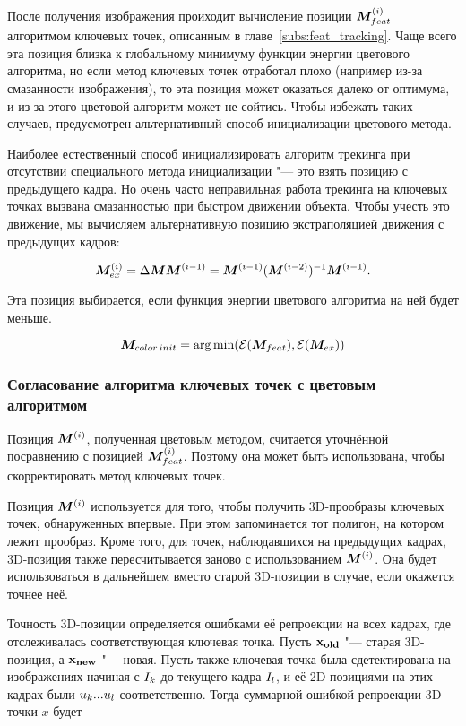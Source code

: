 После получения изображения проиходит вычисление позиции $\bm{M}^{\left( i \right)}_{feat}$
алгоритмом
ключевых точек, описанным в главе~\ref{subs:feat_tracking}.
Чаще всего эта позиция близка к глобальному минимуму функции энергии цветового
алгоритма, но если метод ключевых точек отработал плохо (например из-за
смазанности изображения), то эта позиция может оказаться далеко от оптимума, и
из-за этого цветовой алгоритм может не сойтись.
Чтобы избежать таких случаев, предусмотрен альтернативный способ инициализации
цветового метода.

Наиболее естественный способ инициализировать алгоритм трекинга при отсутствии
специального метода инициализации "--- это взять позицию с предыдущего кадра.
Но очень часто неправильная работа трекинга на ключевых точках вызвана
смазанностью при быстром движении объекта.
Чтобы учесть это движение, мы вычисляем альтернативную позицию экстраполяцией
движения с предыдущих кадров:

\begin{equation}
\label{eqn:extrapolation}
\bm{M}^{\left( i \right)}_{ex} = \Delta \bm{M} \bm{M}^{\left( i - 1 \right)} = \bm{M}^{\left( i -
1 \right)}(\bm{M}^{\left( i - 2 \right)})^{-1} \bm{M}^{\left( i - 1 \right)}
\text{.}
\end{equation}

Эта позиция выбирается, если функция энергии цветового алгоритма на ней будет
меньше.

\begin{equation}
\label{eqn:init_selection}
    \bm{M}_{color \, init} = \operatorname*{arg\,min}(\mathcal{E}(\bm{M}_{feat}), \mathcal{E}(\bm{M}_{ex}))
\end{equation}

\subsubsection*{Согласование алгоритма ключевых точек с цветовым алгоритмом}
Позиция $\bm{M}^{\left( i \right)}$, полученная цветовым методом, считается уточнённой
посравнению с позицией $\bm{M}^{\left( i \right)}_{feat}$.
Поэтому она может быть использована, чтобы скорректировать метод ключевых
точек.

Позиция $\bm{M}^{\left( i \right)}$ используется для того, чтобы получить 3D-прообразы
ключевых точек, обнаруженных впервые.
При этом запоминается тот полигон, на котором лежит прообраз.
Кроме того, для точек, наблюдавшихся на предыдущих кадрах, 3D-позиция также
пересчитывается заново с использованием $\bm{M}^{\left( i \right)}$.
Она будет использоваться в дальнейшем вместо старой 3D-позиции в случае, если
окажется точнее неё.

Точность 3D-позиции определяется ошибками её репроекции на всех кадрах, где
отслеживалась соответствующая ключевая точка.
Пусть $\mathbf{x_{old}}$ "--- старая 3D-позиция, а $\mathbf{x_{new}}$ "--- новая. 
Пусть также ключевая точка была сдетектирована на изображениях начиная с
$I_k$
до текущего кадра $I_l$, и её 2D-позициями на этих кадрах были $\mathnormal{u}_k ...
\mathnormal{u}_l$
соответственно.
Тогда суммарной ошибкой репроекции 3D-точки $x$ будет

